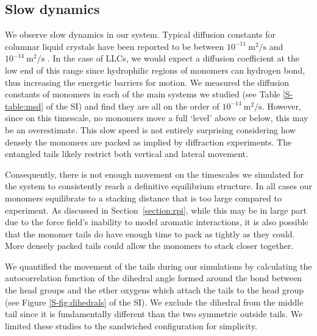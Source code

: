 \documentclass[journal=jpcbfk,manuscript=article]{achemso}
\begin{document}
  \subsection{Slow dynamics}\label{section:slow_dynamics}
  
  We observe slow dynamics in our system. Typical diffusion constants for
  columnar liquid crystals have been reported to be between $10^{-11}~
  \mathrm{m}^2/\mathrm{s}$ \cite{dong_translational_1984} and
  $10^{-14}~\mathrm{m}^2/\mathrm{s}$ \cite{dvinskikh_molecular_2002}.  In the
  case of LLCs, we would expect a diffusion coefficient at the low end of this
  range since hydrophilic regions of monomers can hydrogen bond, thus increasing
  the energetic barriers for motion. We measured the diffusion constants of
  monomers in each of the main systems we studied (see Table \ref{S-table:msd} of
  the SI) and find they are all on the order of
  $10^{-14}~\mathrm{m}^2/\mathrm{s}$. However, since on this timescale, no
  monomers move a full `level' above or below, this may be an overestimate. This
  slow speed is not entirely surprising considering how densely the monomers are
  packed as implied by diffraction experiments. The entangled tails likely
  restrict both vertical and lateral movement.

  Consequently, there is not enough movement on the timescales we simulated for
  the system to consistently reach a definitive equilibrium structure. In all
  cases our monomers equilibrate to a stacking distance that is too large
  compared to experiment.  As discussed in Section~\ref{section:rpi}, while this
  may be in large part due to the force field's inability to model aromatic
  interactions, it is also possible that the monomer tails do have enough time to
  pack as tightly as they could. More densely packed tails could allow the
  monomers to stack closer together. 
  
  We quantified the movement of the tails during our simulations by calculating the 
  autocorrelation function of the dihedral angle formed around the bond between the 
  head groups and the ether oxygens which attach the tails to the head group 
  (see Figure \ref{S-fig:dihedrals} of the SI). We exclude the dihedral from the middle tail 
  since it is fundamentally different than the two symmetric outside tails. We 
  limited these studies to the sandwiched configuration for simplicity.
  
\end{document}
